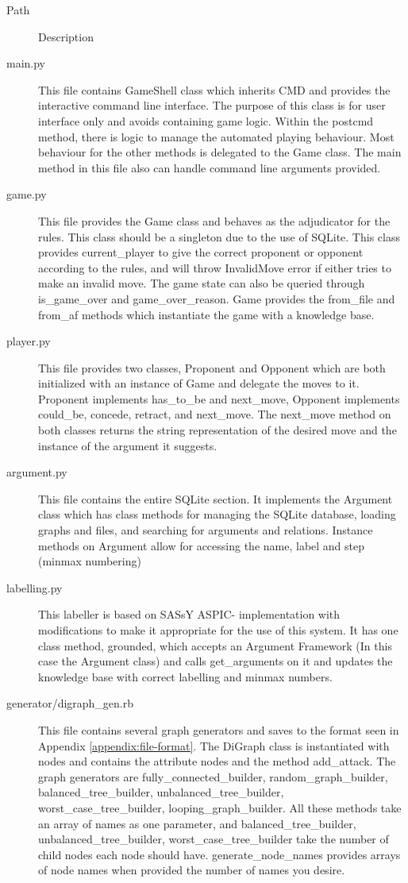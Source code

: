 \documentclass[BSc]{abdnthesis}
\theoremstyle{definition}
\theoremstyle{remark}
\begin{document}
\begin{description}
\item[Path] Description

\item[main.py] This file contains GameShell class which inherits CMD and provides the interactive command line interface. The purpose of this class is for user interface only and avoids containing game logic. Within the postcmd method, there is logic to manage the automated playing behaviour. Most behaviour for the other methods is delegated to the Game class. The main method in this file also can handle command line arguments provided.
\item[game.py] This file provides the Game class and behaves as the adjudicator for the rules. This class should be a singleton due to the use of SQLite. This class provides current\_player to give the correct proponent or opponent according to the rules, and will throw InvalidMove error if either tries to make an invalid move. The game state can also be queried through is\_game\_over and game\_over\_reason. Game provides the from\_file and from\_af methods which instantiate the game with a knowledge base.
\item[player.py] This file provides two classes, Proponent and Opponent which are both initialized with an instance of Game and delegate the moves to it. Proponent implements has\_to\_be and next\_move, Opponent implements could\_be, concede, retract, and next\_move. The next\_move method on both classes returns the string representation of the desired move and the instance of the argument it suggests.
\item[argument.py] This file contains the entire SQLite section. It implements the Argument class which has class methods for managing the SQLite database, loading graphs and files, and searching for arguments and relations. Instance methods on Argument allow for accessing the name, label and step (minmax numbering)
\item[labelling.py] This labeller is based on SASsY ASPIC- implementation with modifications to make it appropriate for the use of this system. It has one class method, grounded, which accepts an Argument Framework (In this case the Argument class) and calls get\_arguments on it and updates the knowledge base with correct labelling and minmax numbers.
\item[generator/digraph\_gen.rb] This file contains several graph generators and saves to the format seen in Appendix \ref{appendix:file-format}. The DiGraph class is instantiated with nodes and contains the attribute nodes and the method add\_attack. The graph generators are fully\_connected\_builder, random\_graph\_builder, balanced\_tree\_builder, unbalanced\_tree\_builder, worst\_case\_tree\_builder, looping\_graph\_builder. All these methods take an array of names as one parameter, and balanced\_tree\_builder, unbalanced\_tree\_builder, worst\_case\_tree\_builder take the number of child nodes each node should have. generate\_node\_names provides arrays of node names when provided the number of names you desire.

\end{description}
\end{document}
